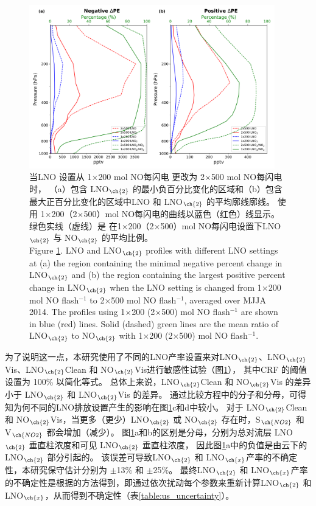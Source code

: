 \begin{figure}[H]
\centering
\includegraphics[width=0.95\textwidth]{./figures/us_lno2_profile.png}
\caption{当LNO 设置从 1$\times$200 mol NO每闪电 更改为 2$\times$500 mol NO每闪电 时，
（a）包含 LNO$_{\ch{2}}$ 的最小负百分比变化的区域和（b）包含最大正百分比变化的区域中LNO 和 LNO$_{\ch{2}}$ 的平均廓线廓线。
使用 1$\times$200（2$\times$500）mol NO每闪电的曲线以蓝色（红色）线显示。
绿色实线（虚线）是 在1$\times$200（2$\times$500）mol NO每闪电设置下LNO$_{\ch{2}}$ 与 NO$_{\ch{2}}$ 的平均比例。\\
Figure \ref{fig:us_lno2_profile}. LNO and LNO$_{\ch{2}}$ profiles with different LNO settings at (a) the region containing the minimal negative percent change in LNO$_{\ch{2}}$ and (b) the region containing the largest positive percent change in LNO$_{\ch{2}}$ when the LNO setting is changed from 1$\times$200 mol NO flash$^{-1}$ to 2$\times$500 mol NO flash$^{-1}$, averaged over MJJA 2014.
The profiles using 1$\times$200 (2$\times$500) mol NO flash$^{-1}$ are shown in blue (red) lines.
Solid (dashed) green lines are the mean ratio of LNO$_{\ch{2}}$ to NO$_{\ch{2}}$ with 1$\times$200 (2$\times$500) mol NO flash$^{-1}$.}
\label{fig:us_lno2_profile}
\end{figure}

为了说明这一点，本研究使用了不同的LNO产率设置来对LNO$_{\ch{2}}$、LNO$_{\ch{2}}$Vis、LNO$_{\ch{2}}$Clean 和 NO$_{\ch{2}}$Vis进行敏感性试验（图\ref{fig:us_lno2_profile}），
其中CRF 的阈值设置为 100\% 以简化等式。
总体上来说，LNO$_{\ch{2}}$Clean 和 NO$_{\ch{2}}$Vis 的差异小于 LNO$_{\ch{2}}$ 和 LNO$_{\ch{2}}$Vis 的差异。
通过比较方程中的分子和分母，可得知为何不同的LNO排放设置产生的影响在图\ref{fig:us_lno2_profile}c和d中较小。
对于 LNO$_{\ch{2}}$Clean 和 NO$_{\ch{2}}$Vis，当更多（更少）LNO$_{\ch{2}}$ 或 NO$_{\ch{2}}$ 存在时，S$_{\ch{NO2}}$ 和 V$_{\ch{NO2}}$ 都会增加（减少）。
图\ref{fig:us_lno2_profile}a和b的区别是分母，分别为总对流层 LNO$_{\ch{2}}$ 垂直柱浓度和可见 LNO$_{\ch{2}}$ 垂直柱浓度，
因此图\ref{fig:us_lno2_profile}a中的负值是由云下的 LNO$_{\ch{2}}$ 部分引起的。
该误差可导致LNO$_{\ch{2}}$ 和 LNO$_{\ch{x}}$产率的不确定性，本研究保守估计分别为 $\pm$13\% 和 $\pm$25\%。
最终LNO$_{\ch{2}}$ 和 LNO$_{\ch{x}}$产率的不确定性是根据\citet{Pickering.2016,Allen.2019,Bucsela.2019,Lapierre.2020}的方法得到，即通过依次扰动每个参数来重新计算LNO$_{\ch{2}}$ 和 LNO$_{\ch{x}}$，从而得到不确定性（表\ref{table:us_uncertainty}）。


